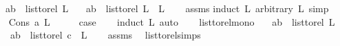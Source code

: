 \begin{isabellebody}
\ \ \ {\isachardoublequoteopen}{\isacharparenleft}{\kern0pt}a{\isacharcomma}{\kern0pt}b{\isacharparenright}{\kern0pt}\ {\isasymin}\ list{\isacharunderscore}{\kern0pt}to{\isacharunderscore}{\kern0pt}rel\ {\isacharparenleft}{\kern0pt}L{\isacharparenright}{\kern0pt}{\isachardoublequoteclose}\isanewline
\ \ \ {\isachardoublequoteopen}{\isacharparenleft}{\kern0pt}a{\isacharcomma}{\kern0pt}b{\isacharparenright}{\kern0pt}\ {\isasymin}\ list{\isacharunderscore}{\kern0pt}to{\isacharunderscore}{\kern0pt}rel\ {\isacharparenleft}{\kern0pt}L\ {\isacharat}{\kern0pt}\ L{}{\isacharparenright}{\kern0pt}{\isachardoublequoteclose}\isanewline
%
\isadelimproof
\ \ %
\endisadelimproof
%
\isatagproof
{}\isamarkupfalse%
\ assms\isanewline
{}\isamarkupfalse%
{\isacharparenleft}{\kern0pt}induct\ L{}\ arbitrary{\isacharcolon}{\kern0pt}\ L{\isacharcomma}{\kern0pt}\ simp{\isacharparenright}{\kern0pt}\isanewline
\ \ \isamarkupfalse%
\ {\isacharparenleft}{\kern0pt}Cons\ a\ L{}{\isacharparenright}{\kern0pt}\isanewline
\ \ \isamarkupfalse%
\ \isamarkupfalse%
\ {\isacharquery}{\kern0pt}case\ \isanewline
\ \ \isamarkupfalse%
{\isacharparenleft}{\kern0pt}induct\ L{\isacharcomma}{\kern0pt}\ auto{\isacharparenright}{\kern0pt}\isanewline
\ \ \isamarkupfalse%
\isanewline
{}\isamarkupfalse%
%
\endisatagproof
{\isafoldproof}%
%
\isadelimproof
\isanewline
%
\endisadelimproof
\isanewline
{}\isamarkupfalse%
\ list{\isacharunderscore}{\kern0pt}to{\isacharunderscore}{\kern0pt}rel{\isacharunderscore}{\kern0pt}mono{}{\isacharcolon}{\kern0pt}\isanewline
\ \ \ {\isachardoublequoteopen}{\isacharparenleft}{\kern0pt}a{\isacharcomma}{\kern0pt}b{\isacharparenright}{\kern0pt}\ {\isasymin}\ list{\isacharunderscore}{\kern0pt}to{\isacharunderscore}{\kern0pt}rel\ {\isacharparenleft}{\kern0pt}L{\isacharparenright}{\kern0pt}{\isachardoublequoteclose}\isanewline
\ \ \ \ {\isachardoublequoteopen}{\isacharparenleft}{\kern0pt}a{\isacharcomma}{\kern0pt}b{\isacharparenright}{\kern0pt}\ {\isasymin}\ list{\isacharunderscore}{\kern0pt}to{\isacharunderscore}{\kern0pt}rel\ {\isacharparenleft}{\kern0pt}c\ {\isacharhash}{\kern0pt}\ L{\isacharparenright}{\kern0pt}{\isachardoublequoteclose}\isanewline
%
\isadelimproof
\ \ %
\endisadelimproof
%
\isatagproof
{}\isamarkupfalse%
\ assms\ \isamarkupfalse%
\ list{\isacharunderscore}{\kern0pt}to{\isacharunderscore}{\kern0pt}rel{\isachardot}{\kern0pt}simps\ \isamarkupfalse%

\end{isabellebody}
